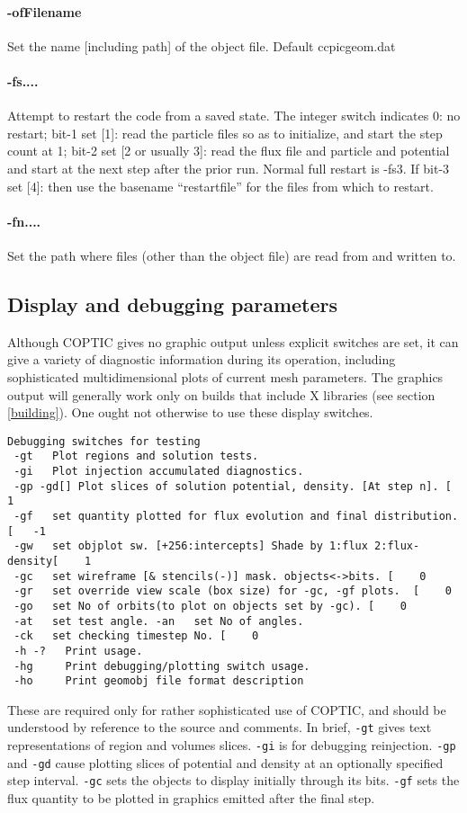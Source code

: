 \documentclass[12pt]{article}
\begin{document}
\paragraph{-ofFilename} Set the name [including path] of the object
file. Default ccpicgeom.dat

\paragraph{-fs....}  Attempt to restart the code from a saved
state. The integer switch indicates 0: no restart; bit-1 set [1]: read
the particle files so as to initialize, and start the step count at 1;
bit-2 set [2 or usually 3]: read the flux file and particle and
potential and start at the next step after the prior run. Normal full
restart is -fs3. If bit-3 set [4]: then use the basename
``restartfile'' for the files from which to restart.

\paragraph{-fn....} Set the path where files (other than the object
file) are read from and written to.

\subsection{Display and debugging parameters}

Although COPTIC gives no graphic output unless explicit switches are
set, it can give a variety of diagnostic information during its
operation, including sophisticated multidimensional plots of current
mesh parameters.  The graphics output will generally work only on
builds that include X libraries (see section \ref{building}). One
ought not otherwise to use these display switches.


\begin{verbatim}
Debugging switches for testing
 -gt   Plot regions and solution tests.
 -gi   Plot injection accumulated diagnostics.
 -gp -gd[] Plot slices of solution potential, density. [At step n]. [    1
 -gf   set quantity plotted for flux evolution and final distribution. [   -1
 -gw   set objplot sw. [+256:intercepts] Shade by 1:flux 2:flux-density[    1
 -gc   set wireframe [& stencils(-)] mask. objects<->bits. [    0
 -gr   set override view scale (box size) for -gc, -gf plots.  [    0
 -go   set No of orbits(to plot on objects set by -gc). [    0
 -at   set test angle. -an   set No of angles. 
 -ck   set checking timestep No. [    0
 -h -?   Print usage.
 -hg     Print debugging/plotting switch usage.
 -ho     Print geomobj file format description
\end{verbatim}
These are required only for rather sophisticated use of COPTIC, and
should be understood by reference to the source and comments. In
brief, \verb!-gt! gives text representations of region and volumes
slices. \verb!-gi! is for debugging reinjection. \verb!-gp! and
\verb!-gd! cause plotting slices of potential and density at an
optionally specified step interval. \verb!-gc! sets the objects to
display initially through its bits. \verb!-gf! sets the flux quantity
to be plotted in graphics emitted after the final step.
\end{document}
